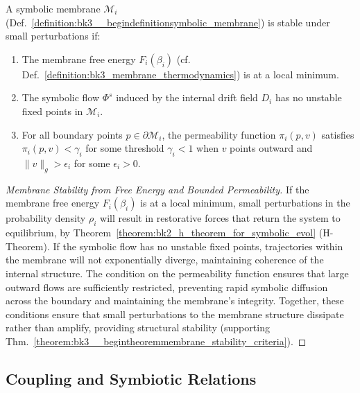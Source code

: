 \begin{theorem} \label{theorem:bk3__begintheoremmembrane_stability_criteria}
A symbolic membrane $\mathcal{M}_i$ (Def.~\ref{definition:bk3__begindefinitionsymbolic_membrane}) is stable under small perturbations if:
\begin{enumerate}
    \item The membrane free energy $F_i(\beta_i)$ (cf. Def.~\ref{definition:bk3_membrane_thermodynamics}) is at a local minimum.
    \item The symbolic flow $\Phi^s$ induced by the internal drift field $D_i$ has no unstable fixed points in $\mathcal{M}_i$.
    \item For all boundary points $p \in \partial\mathcal{M}_i$, the permeability function $\pi_i(p,v)$ satisfies $\pi_i(p,v) < \gamma_i$ for some threshold $\gamma_i < 1$ when $v$ points outward and $\|v\|_g > \epsilon_i$ for some $\epsilon_i > 0$.
\end{enumerate}
\end{theorem}

\begin{proof}[Membrane Stability from Free Energy and Bounded Permeability]
\label{proof:bk3_membrane_stability_energy_permeability}
If the membrane free energy $F_i(\beta_i)$ is at a local minimum, small perturbations in the probability density $\rho_i$ will result in restorative forces that return the system to equilibrium, by Theorem~\ref{theorem:bk2_h_theorem_for_symbolic_evol} (H-Theorem). If the symbolic flow has no unstable fixed points, trajectories within the membrane will not exponentially diverge, maintaining coherence of the internal structure. The condition on the permeability function ensures that large outward flows are sufficiently restricted, preventing rapid symbolic diffusion across the boundary and maintaining the membrane's integrity. Together, these conditions ensure that small perturbations to the membrane structure dissipate rather than amplify, providing structural stability (supporting Thm.~\ref{theorem:bk3__begintheoremmembrane_stability_criteria}).
\end{proof}

\subsection{Coupling and Symbiotic Relations}

